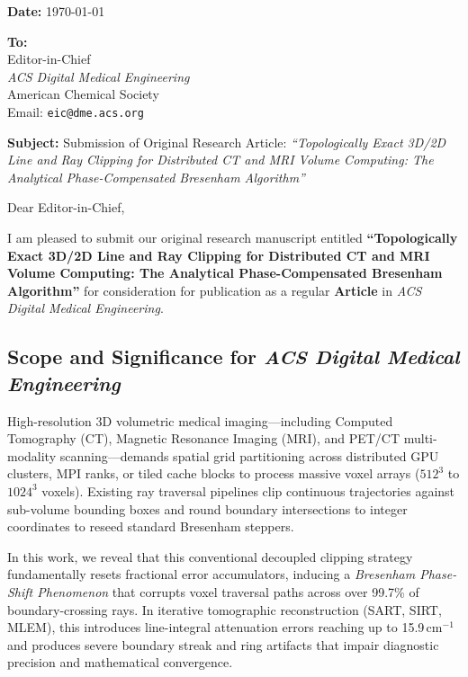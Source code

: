 \documentclass[11pt]{article}
\begin{document}
\noindent \textbf{Date:} \today

\vspace{0.3cm}
\noindent \textbf{To:}\\
Editor-in-Chief\\
\textit{ACS Digital Medical Engineering}\\
American Chemical Society\\
Email: \texttt{eic@dme.acs.org}

\vspace{0.4cm}
\noindent \textbf{Subject:} Submission of Original Research Article: \textit{``Topologically Exact 3D/2D Line and Ray Clipping for Distributed CT and MRI Volume Computing: The Analytical Phase-Compensated Bresenham Algorithm''}

\vspace{0.4cm}
\noindent Dear Editor-in-Chief,

\vspace{0.2cm}
I am pleased to submit our original research manuscript entitled \textbf{``Topologically Exact 3D/2D Line and Ray Clipping for Distributed CT and MRI Volume Computing: The Analytical Phase-Compensated Bresenham Algorithm''} for consideration for publication as a regular \textbf{Article} in \textit{ACS Digital Medical Engineering}.

\subsection*{Scope and Significance for \textit{ACS Digital Medical Engineering}}
High-resolution 3D volumetric medical imaging---including Computed Tomography (CT), Magnetic Resonance Imaging (MRI), and PET/CT multi-modality scanning---demands spatial grid partitioning across distributed GPU clusters, MPI ranks, or tiled cache blocks to process massive voxel arrays ($512^3$ to $1024^3$ voxels). Existing ray traversal pipelines clip continuous trajectories against sub-volume bounding boxes and round boundary intersections to integer coordinates to reseed standard Bresenham steppers. 

In this work, we reveal that this conventional decoupled clipping strategy fundamentally resets fractional error accumulators, inducing a \emph{Bresenham Phase-Shift Phenomenon} that corrupts voxel traversal paths across over 99.7\% of boundary-crossing rays. In iterative tomographic reconstruction (SART, SIRT, MLEM), this introduces line-integral attenuation errors reaching up to 15.9\,cm$^{-1}$ and produces severe boundary streak and ring artifacts that impair diagnostic precision and mathematical convergence.
\end{document}
